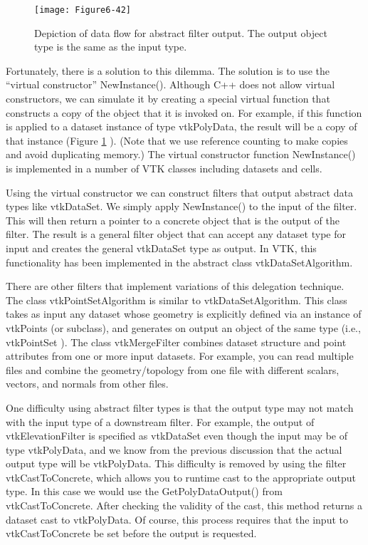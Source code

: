\begin{figure}[!htb]
	\texttt{[image: Figure6-42]}
	\caption{Depiction of data flow for abstract filter output. The output object type is the same as the input type.}\label{fig:Figure6-42}
\end{figure}


Fortunately, there is a solution to this dilemma. The solution is to use the ``virtual constructor'' NewInstance(). Although C++ does not allow virtual constructors, we can simulate it by creating a special virtual function that constructs a copy of the object that it is invoked on. For example, if this function is applied to a dataset instance of type vtkPolyData, the result will be a copy of that instance (Figure \ref{fig:Figure6-42} ). (Note that we use reference counting to make copies and avoid duplicating memory.) The virtual constructor function NewInstance() is implemented in a number of VTK classes including datasets and cells.

Using the virtual constructor we can construct filters that output abstract data types like vtkDataSet. We simply apply NewInstance() to the input of the filter. This will then return a pointer to a concrete object that is the output of the filter. The result is a general filter object that can accept any dataset type for input and creates the general vtkDataSet type as output. In VTK, this functionality has been implemented in the abstract class vtkDataSetAlgorithm.

There are other filters that implement variations of this delegation technique. The class vtkPointSetAlgorithm is similar to vtkDataSetAlgorithm. This class takes as input any dataset whose geometry is explicitly defined via an instance of vtkPoints (or subclass), and generates on output an object of the same type (i.e., vtkPointSet ). The class vtkMergeFilter combines dataset structure and point attributes from one or more input datasets. For example, you can read multiple files and combine the geometry/topology from one file with different scalars, vectors, and normals from other files.

One difficulty using abstract filter types is that the output type may not match with the input type of a downstream filter. For example, the output of vtkElevationFilter is specified as vtkDataSet even though the input may be of type vtkPolyData, and we know from the previous discussion that the actual output type will be vtkPolyData. This difficulty is removed by using the filter vtkCastToConcrete, which allows you to runtime cast to the appropriate output type. In this case we would use the GetPolyDataOutput() from vtkCastToConcrete. After checking the validity of the cast, this method returns a dataset cast to vtkPolyData. Of course, this process requires that the input to vtkCastToConcrete be set before the output is requested.

